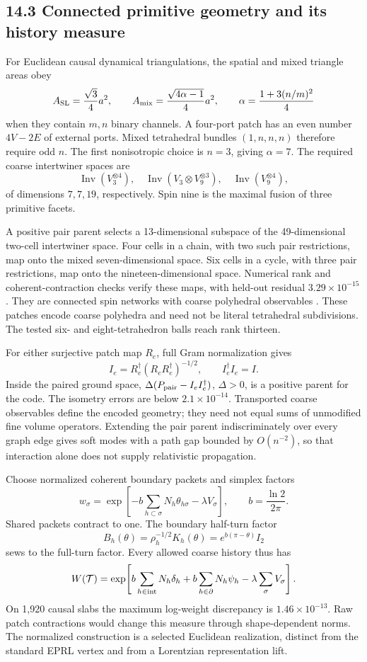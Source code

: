 \documentclass[11pt]{article}
\begin{document}
\subsection{14.3 Connected primitive geometry and its history measure}

For Euclidean causal dynamical triangulations, the spatial and
mixed triangle areas obey
\[
A_{\rm SL}=\frac{\sqrt3}{4}a^2,\qquad
A_{\rm mix}=\frac{\sqrt{4\alpha-1}}4a^2,\qquad
\alpha=\frac{1+3(n/m)^2}{4}
\]
when they contain \(m,n\) binary channels. A four-port patch has
an even number \(4V-2E\) of external ports. Mixed tetrahedral
bundles \((1,n,n,n)\) therefore require odd \(n\).
The first nonisotropic choice is \(n=3\), giving \(\alpha=7\).
The required coarse intertwiner spaces are
\[
\operatorname{Inv}(V_3^{\otimes4}),\quad
\operatorname{Inv}(V_3\otimes V_9^{\otimes3}),\quad
\operatorname{Inv}(V_9^{\otimes4}),
\]
of dimensions \(7,7,19\), respectively.
Spin nine is the maximal fusion of three primitive facets.

A positive pair parent selects a 13-dimensional subspace of
the 49-dimensional two-cell intertwiner space. Four cells in
a chain, with two such pair restrictions, map onto the mixed
seven-dimensional space. Six cells in a cycle, with three pair
restrictions, map onto the nineteen-dimensional space.
Numerical rank and coherent-contraction checks verify these
maps, with held-out residual \(3.29\times10^{-15}\).
They are connected spin networks with coarse polyhedral
observables \citep{AQGBianchi2011}. These patches encode coarse polyhedra and need not be literal
tetrahedral subdivisions. The tested six- and eight-tetrahedron
balls reach rank thirteen.

For either surjective patch map \(R_e\), full Gram normalization
gives
\[
I_e=R_e^\dagger(R_eR_e^\dagger)^{-1/2},
\qquad I_e^\dagger I_e=I.
\]
Inside the paired ground space,
\(\Delta(P_{\rm pair}-I_eI_e^\dagger)\), \(\Delta>0\), is a
positive parent for the code. The isometry errors are below
\(2.1\times10^{-14}\).
Transported coarse observables define the encoded geometry;
they need not equal sums of unmodified fine volume operators.
Extending the pair parent indiscriminately over every graph
edge gives soft modes with a path gap bounded by \(O(n^{-2})\),
so that interaction alone does not supply relativistic propagation.

Choose normalized coherent boundary packets and simplex factors
\[
w_\sigma=\exp\!\left[-b\sum_{h\subset\sigma}N_h\theta_{h\sigma}
-\lambda V_\sigma\right],\qquad b=\frac{\ln2}{2\pi}.
\]
Shared packets contract to one. The boundary half-turn factor
\[
B_h(\theta)=\rho_h^{-1/2}K_h(\theta)=e^{b(\pi-\theta)}I_2
\]
sews to the full-turn factor. Every allowed coarse history thus has
\[
W(\mathcal T)=
\exp\!\left[b\sum_{h\in{\rm int}}N_h\delta_h
+b\sum_{h\in\partial}N_h\psi_h-\lambda\sum_\sigma V_\sigma\right].
\]
On 1,920 causal slabs the maximum log-weight discrepancy is
\(1.46\times10^{-13}\).
Raw patch contractions would change this measure through
shape-dependent norms. The normalized construction is a
selected Euclidean realization, distinct from the standard
EPRL vertex and from a Lorentzian representation lift.
\end{document}

